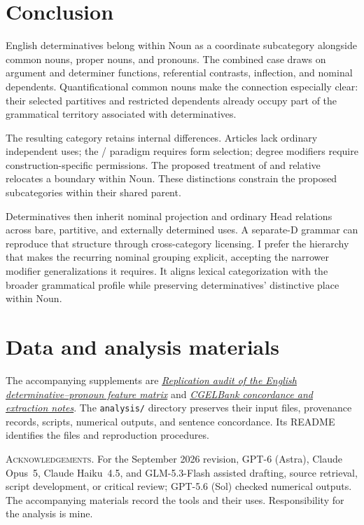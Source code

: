\documentclass[12pt]{article}
\begin{document}
\section{Conclusion}\label{sec:conclusion}

English determinatives belong within Noun as a coordinate subcategory alongside common nouns, proper nouns, and pronouns. The combined case draws on argument and determiner functions, referential contrasts, inflection, and nominal dependents. Quantificational common nouns make the connection especially clear: their selected partitives and restricted dependents already occupy part of the grammatical territory associated with determinatives.

The resulting category retains internal differences. Articles lack ordinary independent uses; the /\allowbreak{} paradigm requires form selection; degree modifiers require construction-specific permissions. The proposed treatment of  and relative  relocates a boundary within Noun. These distinctions constrain the proposed subcategories within their shared parent.

Determinatives then inherit nominal projection and ordinary Head relations across bare, partitive, and externally determined uses. A separate-D grammar can reproduce that structure through cross-category licensing. I prefer the hierarchy that makes the recurring nominal grouping explicit, accepting the narrower modifier generalizations it requires. It aligns lexical categorization with the broader grammatical profile while preserving determinatives' distinctive place within Noun.

\section*{Data and analysis materials}

The accompanying supplements are \href{run:matrix-audit.pdf}{\textit{Replication audit of the English determinative--pronoun feature matrix}} and \href{run:corpus-documentation.pdf}{\textit{CGELBank concordance and extraction notes}}. The \texttt{analysis/} directory preserves their input files, provenance records, scripts, numerical outputs, and sentence concordance. Its README identifies the files and reproduction procedures.

\vspace{0.5\baselineskip}
\noindent\textsc{Acknowledgements.} For the September 2026 revision, GPT-6 (Astra), Claude Opus~5, Claude Haiku~4.5, and GLM-5.3-Flash assisted drafting, source retrieval, script development, or critical review; GPT-5.6 (Sol) checked numerical outputs. The accompanying materials record the tools and their uses. Responsibility for the analysis is mine.

\clearpage
\printbibliography
\end{document}
